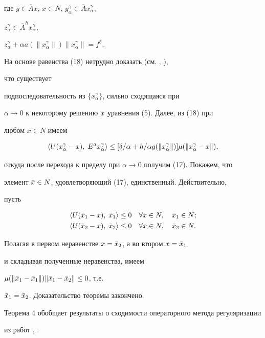 где $y\in\overline Ax$, $x\in N$, $y^\gamma_\alpha\in\overline Ax^\gamma_\alpha$, 


$z^\gamma_\alpha\in\overline A^hx^\gamma_\alpha$, 


$z^\gamma_\alpha+\alpha a(\|x^\gamma_\alpha\|)\|x^\gamma_\alpha\|=f^\delta$. 


На основе равенства (18) нетрудно доказать (см. \cite{Alb}, \cite{Rya1}),


что существует 


подпоследовательность из $\{x^\gamma_\alpha\}$, сильно сходящаяся при 


$\alpha\to 0$ к некоторому решению $\Bar x$ уравнения (5). Далее, из (18) при 


любом $x\in N$ имеем 


$$ 


\la U(x^\gamma_\alpha-x),\;E^ax^\gamma_\alpha\ra\le[\delta/\alpha+ 


h/\alpha g(\|x^\gamma_\alpha\|)]\mu(\|x^\gamma_\alpha-x\|), 


$$ 


откуда после перехода к пределу при $\alpha\to 0$ получим (17). Покажем, что 


элемент $\Bar x\in N$, удовлетворяющий (17), единственный. Действительно, 


пусть 


\begin{align*} 


\la U(\Bar x_1-x),\;\Bar x_1\ra &\le 0\quad \forall x\in N, 


\quad \Bar x_1\in N;\\ 


\la U(\Bar x_2-x),\;\Bar x_2\ra &\le 0\quad \forall x\in N, 


\quad \Bar x_2\in N. 


\end{align*} 


Полагая в первом неравенстве $x=\Bar x_2$, а во втором $x=\Bar x_1$ 


и складывая полученные неравенства, имеем 


$\mu(\|\Bar x_1-\Bar x_1\|)\|\Bar x_1-\Bar x_2\|\le 0$, т.е. 


$\Bar x_1=\Bar x_2$. Доказательство теоремы закончено. 


 


Теорема 4 обобщает результаты о сходимости операторного метода регуляризации 


из работ \cite{Alb}, \cite{Rya1}. 



